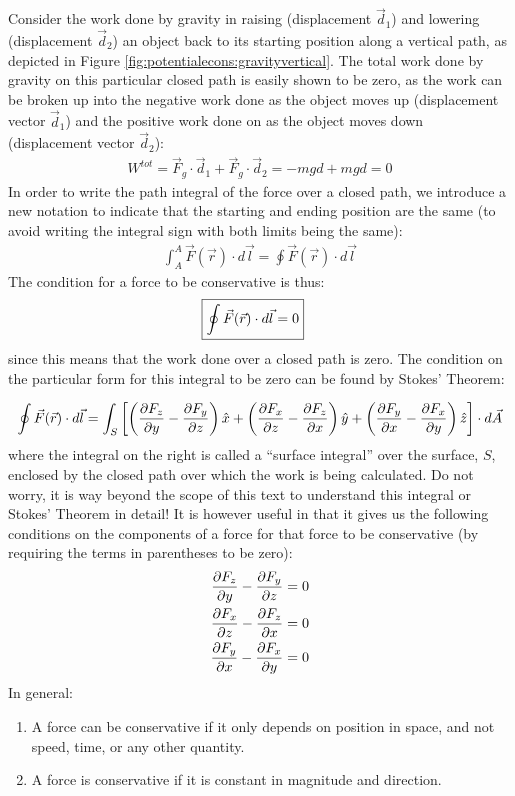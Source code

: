 Consider the work done by gravity in raising (displacement $\vec d_1$) and lowering (displacement $\vec d_2$) an object back to its starting position along a vertical path, as depicted in Figure \ref{fig:potentialecons:gravityvertical}.
The total work done by gravity on this particular closed path is easily shown to be zero, as the work can be broken up into the negative work done as the object moves up (displacement vector $\vec d_1$) and the positive work done on as the object moves down (displacement vector $\vec d_2$):
\begin{align*}
W^{tot} = \vec F_g \cdot \vec d_1 + \vec F_g \cdot \vec d_2 = -mgd + mgd = 0 
\end{align*}
In order to write the path integral of the force over a closed path, we introduce a new notation to indicate that the starting and ending position are the same (to avoid writing the integral sign with both limits being the same): %
\begin{align*}
\int_A^A \vec F(\vec r) \cdot d\vec l = \oint \vec F(\vec r) \cdot d\vec l
\end{align*}
The condition for a force to be conservative is thus:
\begin{align}
\Aboxed{\oint \vec F(\vec r) \cdot d\vec l = 0}
\end{align}
since this means that the work done over a closed path is zero. The condition on the particular form for this integral to be zero can be found by Stokes' Theorem:%

\begin{align*}
\oint \vec F(\vec r) \cdot d\vec l = \int_S \left[\left(\frac{\partial F_z}{\partial y}-\frac{\partial F_y}{\partial z}\right)\hat x+ \left(\frac{\partial F_x}{\partial z}-\frac{\partial F_z}{\partial x}\right)\hat y + \left(\frac{\partial F_y}{\partial x}-\frac{\partial F_x}{\partial y}\right)\hat z \right]\cdot d\vec A
\end{align*}
where the integral on the right is called a ``surface integral'' over the surface, $S$, enclosed by the closed path over which the work is being calculated. Do not worry, it is way beyond the scope of this text to understand this integral or Stokes' Theorem in detail! It is however useful in that it gives us the following conditions on the components of a force for that force to be conservative (by requiring the terms in parentheses to be zero):
\begin{align}
\label{eq:potentialecons:conservative}
\frac{\partial F_z}{\partial y}-\frac{\partial F_y}{\partial z} &= 0 \nonumber\\
\frac{\partial F_x}{\partial z}-\frac{\partial F_z}{\partial x} &= 0\nonumber\\
\frac{\partial F_y}{\partial x}-\frac{\partial F_x}{\partial y} &= 0
\end{align}
In general:
\begin{enumerate}
\item A force can be conservative if it only depends on position in space, and not speed, time, or any other quantity.
\item A force is conservative if it is constant in magnitude and direction.
\end{enumerate}

